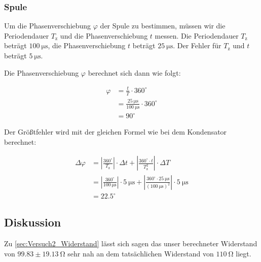         \subsubsection{Spule}
        \label{sec:Versuch2_Spule}
            
            Um die Phasenverschiebung $\varphi$ der Spule zu bestimmen, müssen wir die Periodendauer $T_{\mathrm{z}}$ und die Phasenverschiebung $t$ messen.
            Die Periodendauer $T_{\mathrm{z}}$ beträgt $100\ \mathrm{\mu s}$, die Phasenverschiebung $t$ beträgt $25\ \mathrm{\mu s}$. Der Fehler für $T_{\mathrm{z}}$ und $t$ beträgt $5\ \mathrm{\mu s}$.

            Die Phasenverschiebung $\varphi$ berechnet sich dann wie folgt:

            \begin{equation}
                \begin{aligned}
                    \varphi &= \frac{t}{T} \cdot 360^{\circ}\\
                         &= \frac{25\ \mathrm{\mu s}}{100\ \mathrm{\mu s}} \cdot 360^{\circ}\\
                         &= 90^{\circ}
                \end{aligned}
                \label{eq:Versuch2_Spule_Phasenverschiebung}
            \end{equation}

            Der Größtfehler wird mit der gleichen Formel wie bei dem Kondensator berechnet:

            \begin{equation}
                \begin{aligned}
                    \Delta \varphi &= \left|\frac{360^{\circ}}{T_{\mathrm{z}}}\right| \cdot \Delta t + \left|\frac{360^{\circ} \cdot t}{T_{\mathrm{z}}^{2}}\right| \cdot \Delta T\\
                                   &= \left|\frac{360^{\circ}}{100\ \mathrm{\mu s}}\right| \cdot 5\ \mathrm{\mu s} + \left|\frac{360^{\circ} \cdot 25\ \mathrm{\mu s}}{(100\ \mathrm{\mu s})^{2}}\right| \cdot 5\ \mathrm{\mu s}\\
                                   &= 22.5^{\circ}
                \end{aligned}
                \label{eq:Versuch2_Spule_Phasenverschiebung_Fehler}
            \end{equation}

            \subsection{Diskussion}
                Zu \ref{sec:Versuch2_Widerstand} lässt sich sagen das unser berechneter Widerstand von $99.83 \pm 19.13\ \mathrm{\Omega}$ sehr nah an dem tatsächlichen Widerstand von $110\ \mathrm{\Omega}$ liegt.

